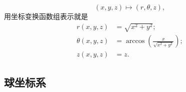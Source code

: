 		\begin{equation}\label{eq:xyz to rthetaz 1}
			(x,y,z)\mapsto(r,\theta,z),
		\end{equation}
		用坐标变换函数组表示就是
		\begin{equation}\label{eq:xyz to rthetaz 2}
			\begin{split}
				r(x,y,z)&=\sqrt{x^2+y^2};\\
				\theta(x,y,z)&=\arccos\left(\frac{x}{\sqrt{x^2+y^2}}\right);\\
				z(x,y,z)&=z.
			\end{split}
		\end{equation}
			
	\subsection{球坐标系}
			
